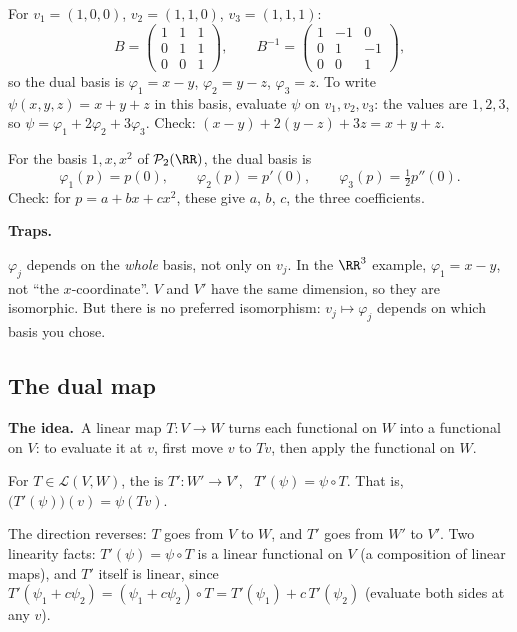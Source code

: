 \documentclass[10pt]{scrartcl}
\newcommand{\LL}{\mathcal L}
\newcommand{\PP}{\mathcal P}
\newcommand{\traps}{\par\medskip\noindent\textbf{\color{RawSienna}Traps.}\ }
\newcommand{\idea}{\par\noindent\textbf{\color{MidnightBlue}The idea.}\ }
\begin{document}
\begin{example*}
  For $v_1=(1,0,0)$, $v_2=(1,1,0)$, $v_3=(1,1,1)$:
  \[ B=\begin{pmatrix}1&1&1\\0&1&1\\0&0&1\end{pmatrix},\qquad B^{-1}=\begin{pmatrix}1&-1&0\\0&1&-1\\0&0&1\end{pmatrix}, \]
  so the dual basis is $\varphi_1=x-y$, $\varphi_2=y-z$, $\varphi_3=z$. To write $\psi(x,y,z)=x+y+z$ in this basis, evaluate $\psi$ on $v_1,v_2,v_3$: the values are $1,2,3$, so $\psi=\varphi_1+2\varphi_2+3\varphi_3$. Check: $(x-y)+2(y-z)+3z=x+y+z$.
\end{example*}

\begin{example*}
  For the basis $1,x,x^2$ of $\PP_2(\RR)$, the dual basis is
  \[ \varphi_1(p)=p(0),\qquad \varphi_2(p)=p'(0),\qquad \varphi_3(p)=\tfrac12p''(0). \]
  Check: for $p=a+bx+cx^2$, these give $a$, $b$, $c$, the three coefficients.
\end{example*}

\traps
\begin{itemize}
  \ii $\varphi_j$ depends on the \emph{whole} basis, not only on $v_j$. In the $\RR^3$ example, $\varphi_1=x-y$, not ``the $x$-coordinate''.
  \ii $V$ and $V'$ have the same dimension, so they are isomorphic. But there is no preferred isomorphism: $v_j\mapsto\varphi_j$ depends on which basis you chose.
\end{itemize}

\subsection{The dual map}
\idea A linear map $T\colon V\to W$ turns each functional on $W$ into a functional on $V$: to evaluate it at $v$, first move $v$ to $Tv$, then apply the functional on $W$.
\begin{center}
\end{center}

\begin{definition*}[Def.~28]
  For $T\in\LL(V,W)$, the  is $T'\colon W'\to V'$, \ $T'(\psi)=\psi\circ T$. That is, $\big(T'(\psi)\big)(v)=\psi(Tv)$.
\end{definition*}
The direction reverses: $T$ goes from $V$ to $W$, and $T'$ goes from $W'$ to $V'$. Two linearity facts: $T'(\psi)=\psi\circ T$ is a linear functional on $V$ (a composition of linear maps), and $T'$ itself is linear, since $T'(\psi_1+c\psi_2)=(\psi_1+c\psi_2)\circ T=T'(\psi_1)+c\,T'(\psi_2)$ (evaluate both sides at any $v$).
\end{document}

